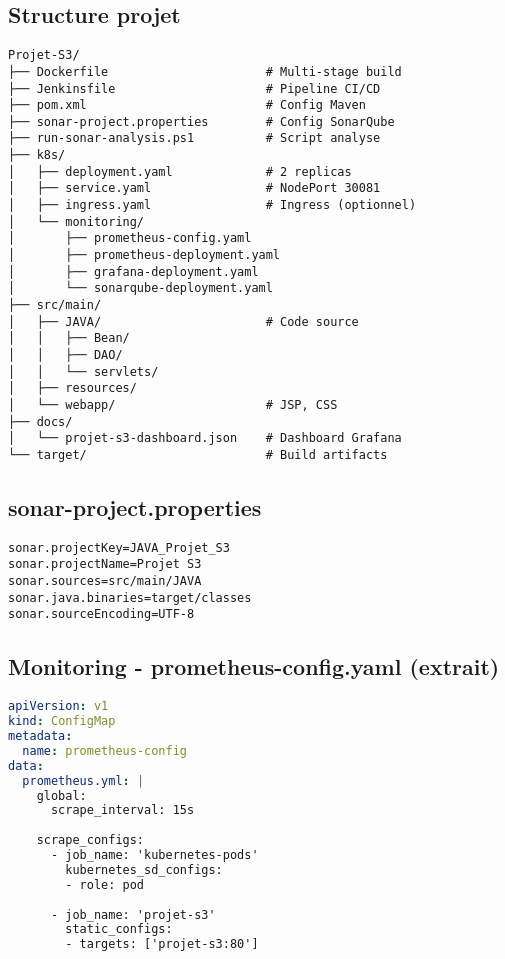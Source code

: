 \documentclass[11pt,a4paper]{article}
\begin{document}
\subsection{Structure projet}
\begin{lstlisting}
Projet-S3/
├── Dockerfile                      # Multi-stage build
├── Jenkinsfile                     # Pipeline CI/CD
├── pom.xml                         # Config Maven
├── sonar-project.properties        # Config SonarQube
├── run-sonar-analysis.ps1          # Script analyse
├── k8s/
│   ├── deployment.yaml             # 2 replicas
│   ├── service.yaml                # NodePort 30081
│   ├── ingress.yaml                # Ingress (optionnel)
│   └── monitoring/
│       ├── prometheus-config.yaml
│       ├── prometheus-deployment.yaml
│       ├── grafana-deployment.yaml
│       └── sonarqube-deployment.yaml
├── src/main/
│   ├── JAVA/                       # Code source
│   │   ├── Bean/
│   │   ├── DAO/
│   │   └── servlets/
│   ├── resources/
│   └── webapp/                     # JSP, CSS
├── docs/
│   └── projet-s3-dashboard.json    # Dashboard Grafana
└── target/                         # Build artifacts
\end{lstlisting}

\subsection{sonar-project.properties}
\begin{lstlisting}
sonar.projectKey=JAVA_Projet_S3
sonar.projectName=Projet S3
sonar.sources=src/main/JAVA
sonar.java.binaries=target/classes
sonar.sourceEncoding=UTF-8
\end{lstlisting}

\subsection{Monitoring - prometheus-config.yaml (extrait)}
\begin{lstlisting}[language=yaml]
apiVersion: v1
kind: ConfigMap
metadata:
  name: prometheus-config
data:
  prometheus.yml: |
    global:
      scrape_interval: 15s
    
    scrape_configs:
      - job_name: 'kubernetes-pods'
        kubernetes_sd_configs:
        - role: pod
        
      - job_name: 'projet-s3'
        static_configs:
        - targets: ['projet-s3:80']
\end{lstlisting}
\end{document}
